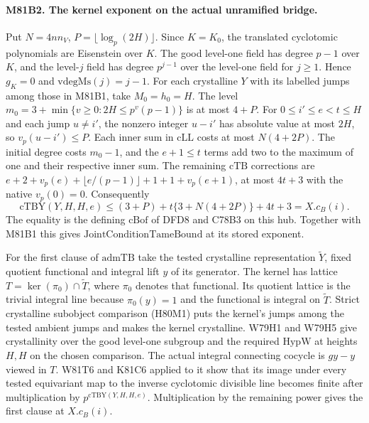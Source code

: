 \paragraph{M81B2. The kernel exponent on the actual unramified bridge.}
Put $N=4nn_V$, $P=\lfloor\log_p(2H)\rfloor$. Since $K=K_0$,
the translated cyclotomic polynomials are Eisenstein over $K$.
The good level-one field has degree $p-1$ over $K$, and the
level-$j$ field has degree $p^{j-1}$ over the level-one field
for $j\ge1$. Hence $g_K=0$ and $\mathrm{vdegMs}(j)=j-1$.
For each crystalline $Y$ with its labelled jumps among those in
M81B1, take $M_0=h_0=H$. The level
$m_0=3+\min\{v\ge0:2H\le p^v(p-1)\}$ is at most $4+P$.
For $0\le i'\le e<t\le H$ and each jump $u\ne i'$, the
nonzero integer $u-i'$ has absolute value at most $2H$, so
$v_p(u-i')\le P$. Each inner sum in $\mathrm{cLL}$ costs at
most $N(4+2P)$. The initial degree costs $m_0-1$, and the
$e+1\le t$ terms add two to the maximum of one and their
respective inner sum. The remaining $\mathrm{cTB}$ corrections
are $e+2+v_p(e)+\lfloor e/(p-1)\rfloor+1+1+v_p(e+1)$,
at most $4t+3$ with the native $v_p(0)=0$. Consequently
\[
 \mathrm{cTBY}(Y,H,H,e)\le
 (3+P)+t\{3+N(4+2P)\}+4t+3=X.c_B(i).
\]
The equality is the defining $\mathrm{cBof}$ of DFD8 and C78B3
on this hub. Together with M81B1 this gives
$\mathrm{JointConditionTameBound}$ at its stored exponent.

For the first clause of $\mathrm{admTB}$ take the tested
crystalline representation $\widetilde Y$, fixed quotient
functional and integral lift $y$ of its generator. The
kernel has lattice $T=\ker(\pi_0)\cap\widetilde T$,
where $\pi_0$ denotes that functional. Its quotient lattice is
the trivial integral line because $\pi_0(y)=1$ and the functional
is integral on $\widetilde T$. Strict crystalline subobject
comparison (H80M1) puts the kernel's jumps among the tested
ambient jumps and makes the kernel crystalline. W79H1 and W79H5
give crystallinity over the good level-one subgroup and the
required $\mathrm{HypW}$ at heights $H,H$ on the chosen
comparison. The actual integral connecting cocycle is $gy-y$
viewed in $T$. W81T6 and K81C6 applied to it show that its
image under every tested equivariant map to the inverse
cyclotomic divisible line becomes finite after multiplication
by $p^{\mathrm{cTBY}(Y,H,H,e)}$. Multiplication by the remaining
power gives the first clause at $X.c_B(i)$.

